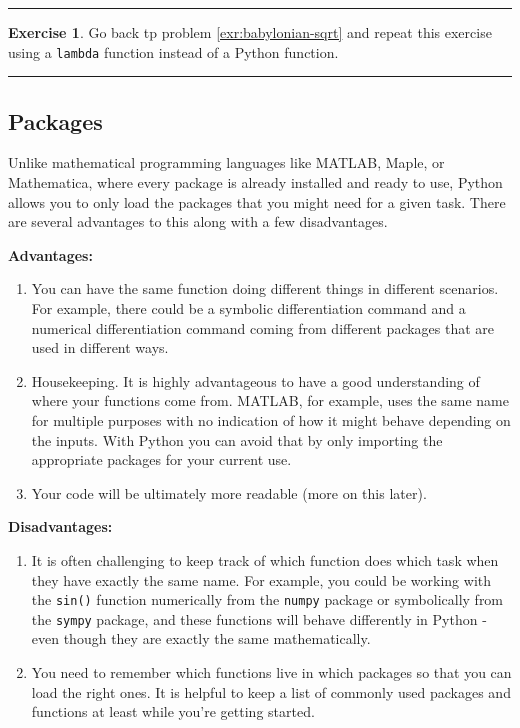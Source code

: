 \documentclass[
]{book}
\theoremstyle{definition}
\theoremstyle{definition}
\theoremstyle{definition}
\newtheorem{exercise}{Exercise}[chapter]
\theoremstyle{remark}
\begin{document}
\begin{center}\rule{0.5\linewidth}{0.5pt}\end{center}

\begin{exercise}
\protect\hypertarget{exr:unnamed-chunk-698}{}{\label{exr:unnamed-chunk-698} }Go back tp problem \ref{exr:babylonian-sqrt} and repeat this exercise using a \texttt{lambda} function instead of a Python function.
\end{exercise}

\begin{center}\rule{0.5\linewidth}{0.5pt}\end{center}

\hypertarget{packages}{%
\subsection{Packages}\label{packages}}

Unlike mathematical programming languages like MATLAB, Maple, or Mathematica, where every package is already installed and ready to use, Python allows you to only load the packages that you might need for a given task. There are several advantages to this along with a few disadvantages.

\textbf{Advantages:}

\begin{enumerate}
\def\labelenumi{\arabic{enumi}.}
\item
  You can have the same function doing different things in different scenarios. For example, there could be a symbolic differentiation command and a numerical differentiation command coming from different packages that are used in different ways.
\item
  Housekeeping. It is highly advantageous to have a good understanding of where your functions come from. MATLAB, for example, uses the same name for multiple purposes with no indication of how it might behave depending on the inputs. With Python you can avoid that by only importing the appropriate packages for your current use.
\item
  Your code will be ultimately more readable (more on this later).
\end{enumerate}

\textbf{Disadvantages:}

\begin{enumerate}
\def\labelenumi{\arabic{enumi}.}
\item
  It is often challenging to keep track of which function does which task when they have exactly the same name. For example, you could be working with the \texttt{sin()} function numerically from the \texttt{numpy} package or symbolically from the \texttt{sympy} package, and these functions will behave differently in Python - even though they are exactly the same mathematically.
\item
  You need to remember which functions live in which packages so that you can load the right ones. It is helpful to keep a list of commonly used packages and functions at least while you're getting started.
\end{enumerate}
\end{document}
